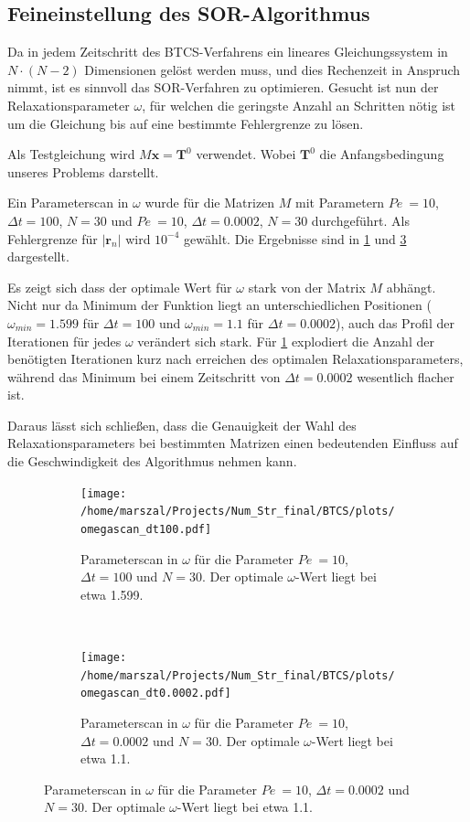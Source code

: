 \subsection{Feineinstellung des SOR-Algorithmus}
Da in jedem Zeitschritt des BTCS-Verfahrens ein lineares Gleichungssystem in $N\cdot(N-2)$ Dimensionen gelöst werden muss, und dies Rechenzeit in Anspruch nimmt, ist es sinnvoll das SOR-Verfahren zu optimieren.
Gesucht ist nun der Relaxationsparameter $\omega$, für welchen die geringste Anzahl an Schritten nötig ist um die Gleichung bis auf eine bestimmte Fehlergrenze zu lösen.

Als Testgleichung wird $M\boldsymbol x = \boldsymbol T^0$ verwendet. Wobei $\boldsymbol T^0$ die Anfangsbedingung unseres Problems darstellt.

Ein Parameterscan in $\omega$ wurde für die Matrizen $M$ mit Parametern $Pe~=10$, $\Delta t=100$, $N=30$ und $Pe~=10$, $\Delta t=0.0002$, $N=30$ durchgeführt. Als Fehlergrenze für $|\boldsymbol r_n|$ wird $10^{-4}$ gewählt.
Die Ergebnisse sind in \cref{fig:parscan100} und \cref{fig:parscan000} dargestellt.

Es zeigt sich dass der optimale Wert für $\omega$ stark von der Matrix $M$ abhängt.
Nicht nur da Minimum der Funktion liegt an unterschiedlichen Positionen ($\omega_{min}=1.599$ für $\Delta t=100$ und $\omega_{min}=1.1$ für $\Delta t=0.0002$), auch das Profil der Iterationen für jedes $\omega$ verändert sich stark. Für \cref{fig:parscan100} explodiert die Anzahl der benötigten Iterationen kurz nach erreichen des optimalen Relaxationsparameters, während das Minimum bei einem Zeitschritt von $\Delta t=0.0002$ wesentlich flacher ist.

Daraus lässt sich schließen, dass die Genauigkeit der Wahl des Relaxationsparameters bei bestimmten Matrizen einen bedeutenden Einfluss auf die Geschwindigkeit des Algorithmus nehmen kann.

\begin{figure}
\centering
\begin{subfigure}[b]{0.45\textwidth}
  \texttt{[image: /home/marszal/Projects/Num\_Str\_final/BTCS/plots/omegascan\_dt100.pdf]}\caption{Parameterscan in $\omega$ für die Parameter $Pe~=10$, $\Delta t=100$ und $N=30$. Der optimale $\omega$-Wert liegt bei etwa 1.599.}\label{fig:parscan100}
\end{subfigure}
~
\begin{subfigure}[b]{0.45\textwidth}
  \texttt{[image: /home/marszal/Projects/Num\_Str\_final/BTCS/plots/omegascan\_dt0.0002.pdf]}\caption{Parameterscan in $\omega$ für die Parameter $Pe~=10$, $\Delta t=0.0002$ und $N=30$. Der optimale $\omega$-Wert liegt bei etwa 1.1.}\label{fig:parscan000}
\end{subfigure}
\end{figure}

